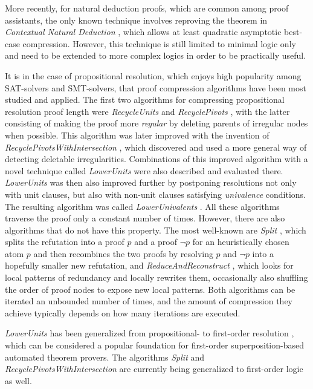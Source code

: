 More recently, for natural deduction proofs, which are common among proof assistants, the only known technique involves reproving the theorem in \emph{Contextual Natural Deduction} \cite{DBLP:conf/lfcs/Paleo13,DBLP:conf/ershov/Paleo15}, which allows at least quadratic asymptotic best-case compression. However, this technique is still limited to minimal logic only and need to be extended to more complex logics in order to be practically useful.

It is in the case of propositional resolution, which enjoys high popularity among SAT-solvers and SMT-solvers, that proof compression algorithms have been most studied and applied. 
The first two algorithms for compressing propositional resolution proof length were \emph{RecycleUnits} and \emph{RecyclePivots} \cite{Bar-Ilan2008}, with the latter consisting of making the proof more \emph{regular} by deleting parents of irregular nodes when possible. 
This algorithm was later improved with the invention of \emph{RecyclePivotsWithIntersection} \cite{Fontaine2011}, which discovered and used a more general way of detecting deletable irregularities. Combinations of this improved algorithm with a novel technique called \emph{LowerUnits} \cite{Fontaine2011} were also described and evaluated there. 
\emph{LowerUnits} was then also improved further by postponing resolutions not only with unit clauses, but also with non-unit clauses satisfying \emph{univalence} conditions. 
The resulting algorithm was called \emph{LowerUnivalents} \cite{DBLP:conf/tableaux/BoudouP13}. 
All these algorithms traverse the proof only a constant number of times. 
However, there are also algorithms that do not have this property. 
The most well-known are \emph{Split} \cite{cotton2010two}, which splits the refutation into a proof $p$ and a proof $\neg p$ for an heuristically chosen atom $p$ and then recombines the two proofs by resolving $p$ and $\neg p$ into a hopefully smaller new refutation, and \emph{ReduceAndReconstruct} \cite{DBLP:conf/hvc/RolliniBS10}, which looks for local patterns of redundancy and locally rewrites them, occasionally also shuffling the order of proof nodes to expose new local patterns. 
Both algorithms can be iterated an unbounded number of times, and the amount of compression they achieve typically depends on how many iterations are executed.

\emph{LowerUnits} has been generalized from propositional- to first-order resolution \cite{DBLP:conf/cade/GorznyP15}, which can be considered a popular foundation for first-order superposition-based automated theorem provers. 
The algorithms \emph{Split} and \emph{RecyclePivotsWithIntersection} are currently being generalized to first-order logic as well.

